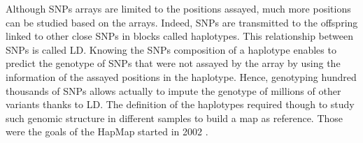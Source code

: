 Although \gls*{SNP}s arrays are limited to the positions assayed, much more positions can be studied based on the arrays. Indeed, \gls*{SNP}s are transmitted to the offspring linked to other close \gls*{SNP}s in blocks called haplotypes. This relationship between \gls*{SNP}s is called \gls{LD}. Knowing the \gls*{SNP}s composition of a haplotype enables to predict the genotype of \gls*{SNP}s that were not assayed by the array by using the information of the assayed positions in the haplotype. Hence, genotyping hundred thousands of \gls*{SNP}s allows actually to impute the genotype of millions of other variants thanks to \gls{LD}. The definition of the haplotypes required though to study such genomic structure in different samples to build a map as reference. Those were the goals of the \gls{HapMap} started in 2002 \cite{Belmont2003,Hapmap_britannica}.


